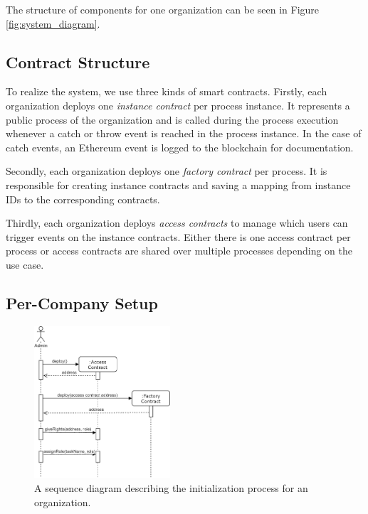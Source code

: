 \documentclass[runningheads]{llncs}
\begin{document}
The structure of components for one organization can be seen in Figure \ref{fig:system_diagram}.

\subsection{Contract Structure}
To realize the system, we use three kinds of smart contracts.
Firstly, each organization deploys one \emph{instance contract} per process instance.
It represents a public process of the organization and is called during the process execution whenever a catch or throw event is reached in the process instance.
In the case of catch events, an Ethereum event is logged to the blockchain for documentation.

Secondly, each organization deploys one \emph{factory contract} per process.
It is responsible for creating instance contracts and saving a mapping from instance IDs to the corresponding contracts.

Thirdly, each organization deploys \emph{access contracts} to manage which users can trigger events on the instance contracts.
Either there is one access contract per process or access contracts are shared over multiple processes depending on the use case.

\subsection{Per-Company Setup}

\begin{figure}
	\centering
	\includegraphics[width=0.45\textwidth]{fig/initialization.eps}
	\caption{A sequence diagram describing the initialization process for an organization.}
	\label{fig:initialization}
\end{figure}
\end{document}
